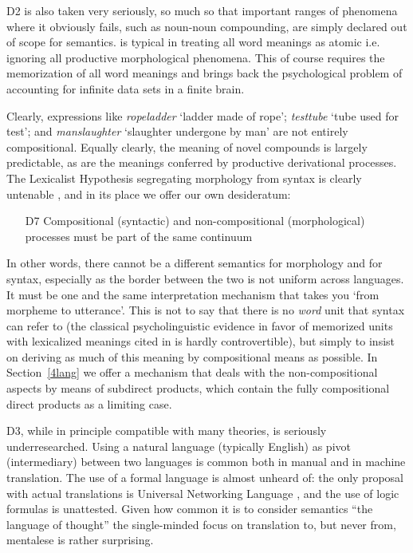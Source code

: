 \documentclass[output=paper,colorlinks=true,citecolor=brown]{langscibook}
\begin{document}
\medskip\noindent D2 is also taken very seriously, so much so that important
ranges of phenomena where it obviously fails, such as noun-noun compounding,
are simply declared out of scope for semantics. \citet{Fodor:1998} is typical
in treating all word meanings as atomic i.e. ignoring all productive
morphological phenomena. This of course requires the memorization of all word
meanings and brings back the psychological problem
\citep{Partee:1979,Partee:2013} of accounting for infinite data sets in a
finite brain.

Clearly, expressions like \emph{ropeladder} `ladder made of rope'; \emph{testtube} `tube used for test'; and \emph{manslaughter} `slaughter undergone
by man' \citep{Kiparsky:1982b} are not entirely compositional. Equally
clearly, the meaning of novel compounds is largely predictable, as are the
meanings conferred by productive derivational processes. The Lexicalist
Hypothesis \citep{Chomsky:1970} segregating morphology from syntax is clearly
untenable \citep{Bruening:2018}, and in its place we offer our own
desideratum:

\begin{itemize}
\item[D7] 
  Compositional (syntactic) and non-compositional (morphological)
  process\-es must be part of the same continuum
\end{itemize}

In other words, there cannot be a different semantics for morphology and for
syntax, especially as the border between the two is not uniform across
languages. It must be one and the same interpretation mechanism that takes you
`from morpheme to utterance'. This is not to say that there is no \emph{word}
unit that syntax can refer to (the classical psycholinguistic evidence in
favor of memorized units with lexicalized meanings cited in \cite{Muller:2018}
is hardly controvertible), but simply to insist on deriving as much of this
meaning by compositional means as possible. In Section~\ref{4lang} we offer a
mechanism that deals with the non-compositional aspects by means of subdirect
products, which contain the fully compositional direct products as a limiting
case.

\medskip\noindent D3, while in principle compatible with many theories, is
seriously underresearch\-ed. Using a natural language (typically English) as
pivot (intermediary) between two languages is common both in manual and in
machine translation. The use of a formal language is almost unheard of: the
only proposal with actual translations is Universal Networking Language
\citep{Cardenosa:2005}, and the use of logic formulas is unattested. Given how
common it is to consider semantics ``the language of thought'' the
single-minded focus on translation to, but never from, mentalese is rather
surprising.
\end{document}
